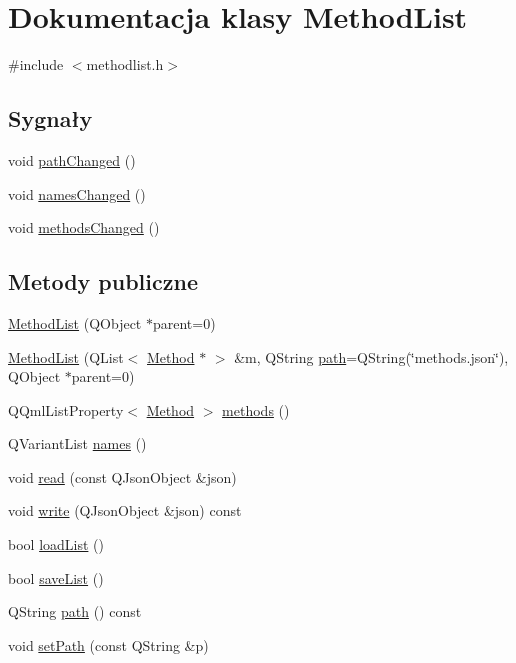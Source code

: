 \hypertarget{class_method_list}{\section{Dokumentacja klasy Method\-List}
\label{class_method_list}
}


{\ttfamily \#include $<$methodlist.\-h$>$}

\subsection*{Sygnały}
\begin{DoxyCompactItemize}
\item 
void \hyperlink{class_method_list_a964af96ad04ea475a562ef9c437c9395}{path\-Changed} ()
\item 
void \hyperlink{class_method_list_a22b1996a1f49c974ffcc596e3840747a}{names\-Changed} ()
\item 
void \hyperlink{class_method_list_aaf15b5a1bfb251c39fc5d50c2f7e39d7}{methods\-Changed} ()
\end{DoxyCompactItemize}
\subsection*{Metody publiczne}
\begin{DoxyCompactItemize}
\item 
\hyperlink{class_method_list_ae859d2576fa0bd370d458af57948e22e}{Method\-List} (Q\-Object $\ast$parent=0)
\item 
\hyperlink{class_method_list_ac434ec0f3fea8b75ac0762d235441206}{Method\-List} (Q\-List$<$ \hyperlink{class_method}{Method} $\ast$ $>$ \&m, Q\-String \hyperlink{class_method_list_aac51cd62c2c4e2cfb7a4a8053555ea61}{path}=Q\-String(\char`\"{}methods.\-json\char`\"{}), Q\-Object $\ast$parent=0)
\item 
Q\-Qml\-List\-Property$<$ \hyperlink{class_method}{Method} $>$ \hyperlink{class_method_list_ac0e3f7172a72d25b66a50289d67a1e0f}{methods} ()
\item 
Q\-Variant\-List \hyperlink{class_method_list_a23142d6732e57d998153b8f4be2bc974}{names} ()
\item 
void \hyperlink{class_method_list_ae9a0004ee6cbe2f7cccc1cbd5f5488bb}{read} (const Q\-Json\-Object \&json)
\item 
void \hyperlink{class_method_list_af0d4511d7f5bfb5003a33e8c0d50b4bd}{write} (Q\-Json\-Object \&json) const 
\item 
bool \hyperlink{class_method_list_aaad20483391f3c7f6ffe68a7a4973353}{load\-List} ()
\item 
bool \hyperlink{class_method_list_a76d02473ee8a03c714c72c202fdd20f4}{save\-List} ()
\item 
Q\-String \hyperlink{class_method_list_ad2eb51d43787a28502722c7ef92b6f84}{path} () const 
\item 
void \hyperlink{class_method_list_ae08b28e21d8f75374c5d6e295516eeeb}{set\-Path} (const Q\-String \&p)
\end{DoxyCompactItemize}
